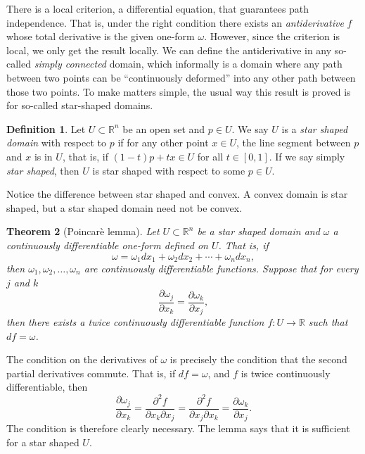 \documentclass[12pt]{book}
\newcommand{\R}{{\mathbb{R}}}
\newcommand{\myindex}[1]{#1\index{#1}}
\theoremstyle{plain}
\newtheorem{thm}{Theorem}[section]
\theoremstyle{remark}
\theoremstyle{definition}
\newtheorem{defn}[thm]{Definition}
\theoremstyle{exercise}
\theoremstyle{example}
\begin{document}
There is a local criterion, a differential equation, that guarantees
path independence.  That is, under the right condition there exists
an \emph{antiderivative} $f$ whose total derivative is the given one-form
$\omega$.  However, since the criterion is local, we only get the result
locally.  We can define the antiderivative in any so-called
\emph{simply connected} domain, which informally is a domain where
any path between two points can be ``continuously deformed''
into any other path
between those two points.  To make matters simple, the usual way
this result is proved is for so-called star-shaped domains.

\begin{defn}
Let $U \subset \R^n$ be an open set and $p \in U$.  We say $U$ is
a \emph{\myindex{star shaped domain}}
with respect to $p$ if for any other point $x \in U$,
the line segment between $p$ and $x$ is in $U$, that is, if
$(1-t)p + tx \in U$ for all $t \in [0,1]$.
If we say simply \emph{star shaped}, then $U$ is star shaped with respect to
some $p \in U$.
\end{defn}

Notice the difference between star shaped and convex.  A convex domain is
star shaped, but a star shaped domain need not be convex.

\begin{thm}[\myindex{Poincar\`e lemma}]
Let $U \subset \R^n$ be a star shaped domain and $\omega$ a continuously
differentiable one-form defined on $U$.  That is, if
\begin{equation*}
\omega =
\omega_1 dx_1 +
\omega_2 dx_2 + \cdots +
\omega_n dx_n ,
\end{equation*}
then $\omega_1,\omega_2,\ldots,\omega_n$ are continuously differentiable
functions.  Suppose that for every $j$ and $k$
\begin{equation*}
\frac{\partial \omega_j}{\partial x_k} = \frac{\partial \omega_k}{\partial x_j} ,
\end{equation*}
then there exists a twice continuously differentiable function $f \colon U
\to \R$
such that $df = \omega$.
\end{thm}

The condition on the derivatives of $\omega$ is precisely the condition
that the second partial derivatives commute.  That is, if $df = \omega$,
and $f$ is twice continuously differentiable, then
\begin{equation*}
\frac{\partial \omega_j}{\partial x_k}
=
\frac{\partial^2 f}{\partial x_k \partial x_j} 
=
\frac{\partial^2 f}{\partial x_j \partial x_k} 
=
\frac{\partial \omega_k}{\partial x_j} .
\end{equation*}
The condition is therefore clearly necessary.  The lemma says that it is
sufficient for a star shaped $U$.
\end{document}
